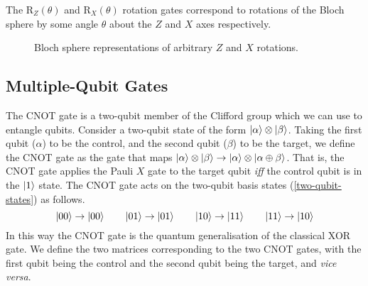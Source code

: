 The R$_Z(\theta)$ and R$_X(\theta)$ rotation gates correspond to rotations of the Bloch sphere by some angle $\theta$ about the $Z$ and $X$ axes respectively.

\begin{figure}[H]
    \centering
    \begin{minipage}{0.45\textwidth}
        \centering
    \end{minipage}
    \begin{minipage}{0.45\textwidth}
        \centering
    \end{minipage}
    \caption{Bloch sphere representations of arbitrary $Z$ and $X$ rotations.}
    \label{z-rotation-definition}
    \label{x-rotation-definition}
\end{figure}

\subsection{Multiple-Qubit Gates}

The CNOT gate is a two-qubit member of the Clifford group which we can use to entangle qubits. Consider a two-qubit state of the form $\ket \alpha \otimes \ket \beta$. Taking the first qubit ($\alpha$) to be the control, and the second qubit ($\beta$) to be the target, we define the CNOT gate as the gate that maps $\ket\alpha\otimes\ket\beta \rightarrow \ket\alpha\otimes\ket{\alpha\oplus\beta}$. That is, the CNOT gate applies the Pauli $X$ gate to the target qubit \textit{iff} the control qubit is in the $\ket 1$ state. The CNOT gate acts on the two-qubit basis states (\ref{two-qubit-states}) as follows.
\begin{equation*}
    \ket{00} \rightarrow \ket {00} \qquad
    \ket{01} \rightarrow \ket {01} \qquad
    \ket{10} \rightarrow \ket {11} \qquad
    \ket{11} \rightarrow \ket {10}
\end{equation*}
In this way the CNOT gate is the quantum generalisation of the classical XOR gate. We define the two matrices corresponding to the two CNOT gates, with the first qubit being the control and the second qubit being the target, and \textit{vice versa}.

